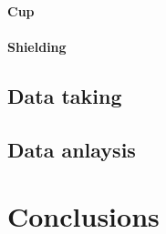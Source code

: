 \begin{refsection}
        \paragraph{Cup}
        \paragraph{Shielding}
    \subsection{Data taking}
    \subsection{Data anlaysis}

\section{Conclusions}

\printbibliography[
    heading = bibliographychapter,
    title=Bibliography on \ce{LH2}
]

\end{refsection}

